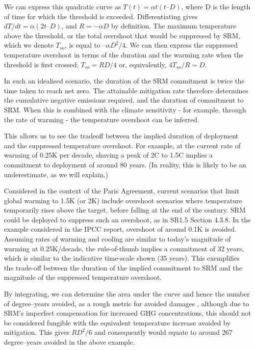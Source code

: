 \documentclass[draft]{agujournal2019}
\begin{document}
\medskip

We can express this quadratic curve as $ T(t) = \alpha t (t – D) $, where D is the length of time for which the threshold is exceeded. Differentiating gives $ dT/dt = \alpha (2t – D)$, and $R = - \alpha D$ by definition. The maximum temperature above the threshold, or the total overshoot that would be suppressed by SRM, which we denote $T_{so}$, is equal to $– \alpha D^2 / 4.$ We can then express the suppressed temperature overshoot in terms of the duration and the warming rate when the threshold is first crossed: $T_{so} = RD/4$ or, equivalently, $4T_{so}/R = D.$

\medskip

In such an idealised scenario, the duration of the SRM commitment is twice the time taken to reach net zero. The attainable mitigation rate therefore determines the cumulative negative emissions required, and the duration of commitment to SRM. When this is combined with the climate sensitivity - for example, through the rate of warming - the temperature overshoot can be inferred. 

\medskip

This allows us to see the tradeoff between the implied duration of deployment and the suppressed temperature overshoot. For example, at the current rate of warming of 0.25K per decade, shaving a peak of 2C to 1.5C implies a commitment to deployment of around 80 years. (In reality, this is likely to be an underestimate, as we will explain.) 

\medskip

Considered in the context of the Paris Agreement, current scenarios that limit global warming to 1.5K (or 2K) include overshoot scenarios where temperature temporarily rises above the target, before falling at the end of the century. SRM could be deployed to suppress such an overshoot, as in SR1.5 Section 4.3.8. In the example considered in the IPCC report, overshoot of around 0.1K is avoided.  Assuming rates of warming and cooling are similar to today’s magnitude of warming at 0.25K/decade, the rule-of-thumb implies a commitment of 32 years, which is similar to the indicative time-scale shown (35 years). This exemplifies the trade-off between the duration of the implied commitment to SRM and the magnitude of the suppressed temperature overshoot.


\medskip

By integrating, we can determine the area under the curve and hence the number of degree–years avoided, as a rough metric for avoided damages \cite{smith2013long}, although due to SRM's imperfect compensation for increased GHG concentrations, this should not be considered fungible with the equivalent temperature increase avoided by mitigation. This gives $RD^{2}/6$ and consequently would equate to around 267 degree–years avoided in the above example. 
\end{document}
